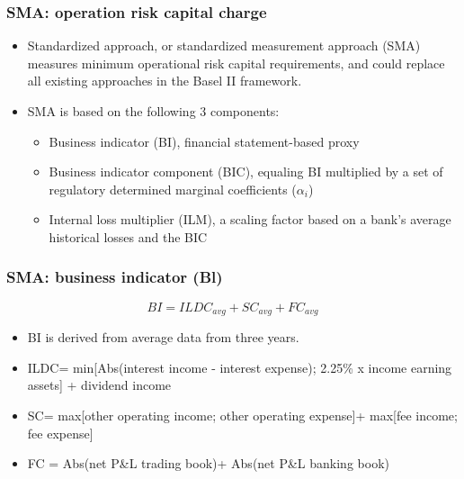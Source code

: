 \subsubsection{SMA: operation risk capital charge}
\begin{itemize}
\item Standardized approach, or standardized measurement approach (SMA) measures minimum operational risk capital requirements, and could replace all existing approaches in the Basel II framework.
\item SMA is based on the following 3 components:
    \begin{itemize}
    \item Business indicator (BI), financial statement-based proxy
    \item Business indicator component (BIC), equaling BI multiplied by a set of regulatory determined marginal coefficients ($\alpha_i$)
    \item Internal loss multiplier (ILM), a scaling factor based on a bank's average historical losses and the BIC
    \end{itemize}
\end{itemize}


\subsubsection{SMA: business indicator (Bl)}
\begin{equation}
BI = ILDC_{avg} + SC_{avg} + FC_{avg}
\end{equation}

\begin{itemize}
\item BI is derived from average data from three years.
\item ILDC= min[Abs(interest income - interest expense); 2.25\% x income earning assets] + dividend income
\item SC= max[other operating income; other operating expense]+ max[fee income; fee expense]
\item FC = Abs(net P\&L trading book)+ Abs(net P\&L banking book)
\end{itemize}


